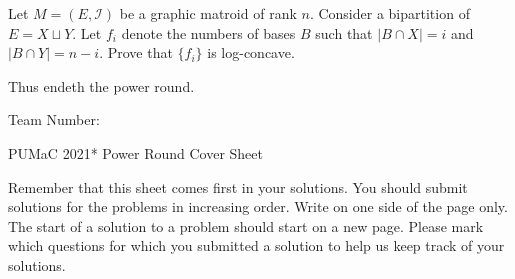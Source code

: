 \documentclass[11pt]{article}
\begin{document}
\begin{prob} [40 points]
    Let $M = (E, \mathcal{I})$ be a graphic matroid of rank $n$. Consider a bipartition of $E = X \sqcup Y$. Let $f_i$ denote the numbers of bases $B$ such that $|B \cap X| = i$ and $|B \cap Y| = n-i$. Prove that $\{f_i\}$ is log-concave. 
\end{prob}

Thus endeth the power round. 
\newpage

\thispagestyle{empty}
\noindent \huge{Team Number:} \underline{\phantom{xxxxxxxxxxxxxxxxxxxxxxxxxxxx}}

\vspace{.5cm}
\noindent \huge{PUMaC 2021* Power Round Cover Sheet}

\vspace{.5cm}
\normalsize
Remember that this sheet comes first in your solutions. You should submit solutions for the problems in increasing order. Write on one side of the page only. The start of a solution to a problem should start on a new page. Please mark which questions for which you submitted a solution to help us keep track of your solutions.\newline
\end{document}
